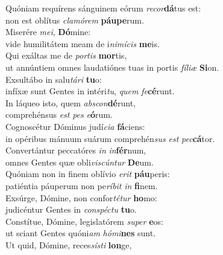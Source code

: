 \evenverse Quóniam requírens sánguinem eórum \textit{re}\textit{cor}\textbf{dá}tus est:~\*\\
\evenverse non est oblítus \textit{cla}\textit{mó}\textit{rem} \textbf{páu}\textbf{pe}rum.\\
\oddverse Miserére \textit{me}\textit{i}, \textbf{Dó}mine:~\*\\
\oddverse vide humilitátem meam de i\textit{ni}\textit{mí}\textit{cis} \textbf{me}is.\\
\evenverse Qui exáltas me de \textit{por}\textit{tis} \textbf{mor}tis,~\*\\
\evenverse ut annúntiem omnes laudatiónes tuas in portis \textit{fí}\textit{li}\textit{æ} \textbf{Si}on.\\
\oddverse Exsultábo in salu\textit{tá}\textit{ri} \textbf{tu}o:~\*\\
\oddverse infíxæ sunt Gentes in intéri\textit{tu}, \textit{quem} \textit{fe}\textbf{cé}runt.\\
\evenverse In láqueo isto, quem \textit{ab}\textit{scon}\textbf{dé}runt,~\*\\
\evenverse comprehénsus \textit{est} \textit{pes} \textit{e}\textbf{ó}rum.\\
\oddverse Cognoscétur Dóminus judí\textit{ci}\textit{a} \textbf{fá}ciens:~\*\\
\oddverse in opéribus mánuum suárum comprehén\textit{sus} \textit{est} \textit{pec}\textbf{cá}tor.\\
\evenverse Convertántur peccatóres \textit{in} \textit{in}\textbf{fér}num,~\*\\
\evenverse omnes Gentes quæ obli\textit{vi}\textit{scún}\textit{tur} \textbf{De}um.\\
\oddverse Quóniam non in finem oblívio \textit{e}\textit{rit} \textbf{páu}peris:~\*\\
\oddverse patiéntia páuperum non pe\textit{rí}\textit{bit} \textit{in} \textbf{fi}nem.\\
\evenverse Exsúrge, Dómine, non confor\textit{té}\textit{tur} \textbf{ho}mo:~\*\\
\evenverse judicéntur Gentes in \textit{con}\textit{spé}\textit{ctu} \textbf{tu}o.\\
\oddverse Constítue, Dómine, legislatórem \textit{su}\textit{per} \textbf{e}os:~\*\\
\oddverse ut sciant Gentes quóni\textit{am} \textit{hó}\textit{mi}\textbf{nes} sunt.\\
\evenverse Ut quid, Dómine, reces\textit{sí}\textit{sti} \textbf{lon}ge,~\*\\
